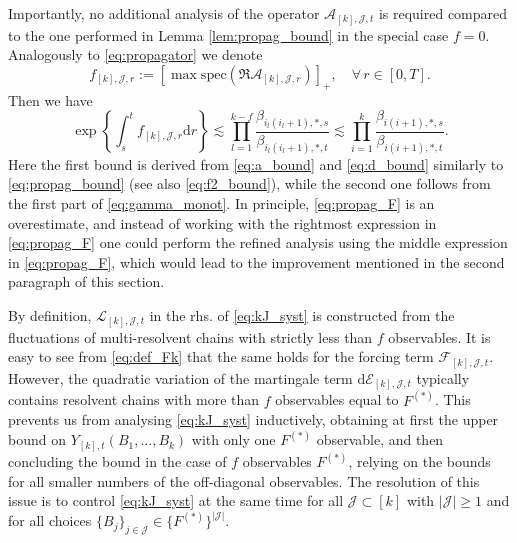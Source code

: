 \documentclass[10pt]{amsart}
\numberwithin{equation}{section}
\newcommand{\dif}{\mathrm{d}}
\begin{document}
Importantly, no additional analysis of the operator $\mathcal{A}_{[k],\mathcal{J},t}$ is required compared to the one performed in Lemma \ref{lem:propag_bound} in the special case $f=0$. Analogously to \eqref{eq:propagator} we denote
\begin{equation*}
f_{[k],\mathcal{J},r}:=\left[ \max \mathrm{spec}(\Re \mathcal{A}_{[k],\mathcal{J},r})\right]_+,\quad \forall\, r\in[0,T]. 
\end{equation*}
Then we have
\begin{equation}
\exp\left\lbrace\int_s^t f_{[k],\mathcal{J},r} \dif r\right\rbrace \lesssim \prod_{l=1}^{k-f} \frac{\beta_{i_l(i_l+1),*,s}}{\beta_{i_l(i_l+1),*,t}}\lesssim \prod_{i=1}^{k} \frac{\beta_{i(i+1),*,s}}{\beta_{i(i+1),*,t}}.
\label{eq:propag_F}
\end{equation}
Here the first bound is derived from \eqref{eq:a_bound} and \eqref{eq:d_bound} similarly to \eqref{eq:propag_bound} (see also \eqref{eq:f2_bound}), while the second one follows from the first part of \eqref{eq:gamma_monot}. In principle, \eqref{eq:propag_F} is an overestimate, and instead of working with the rightmost expression in \eqref{eq:propag_F} one could perform the refined analysis using the middle expression in \eqref{eq:propag_F}, which would lead to the improvement mentioned in the second paragraph of this section.


By definition, $\mathcal{L}_{[k],\mathcal{J},t}$ in the rhs. of \eqref{eq:kJ_syst} is constructed from the fluctuations of multi-resolvent chains with strictly less than $f$ observables. It is easy to see from \eqref{eq:def_Fk} that the same holds for the forcing term $\mathcal{F}_{[k],\mathcal{J},t}$. However, the quadratic variation of the martingale term $\dif \mathcal{E}_{[k],\mathcal{J},t}$ typically contains resolvent chains with more than $f$ observables equal to $F^{(*)}$. This prevents us from analysing \eqref{eq:kJ_syst} inductively, obtaining at first the upper bound on $Y_{[k],t}(B_1,\ldots,B_k)$ with only one $F^{(*)}$ observable, and then concluding the bound in the case of $f$ observables $F^{(*)}$, relying on the bounds for all smaller numbers of the off-diagonal observables. The resolution of this issue is to control \eqref{eq:kJ_syst} at the same time for all $\mathcal{J}\subset [k]$ with $|\mathcal{J}|\ge 1$ and for all choices $\{B_j\}_{j\in\mathcal{J}}\in \{F^{(*)}\}^{|\mathcal{J}|}$. 
\end{document}
